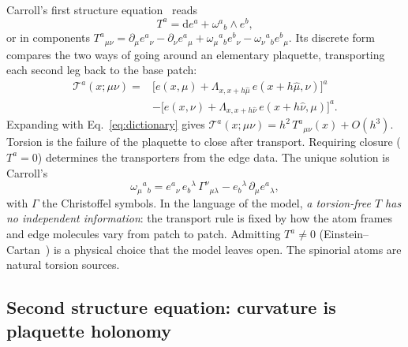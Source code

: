 \documentclass[reprint,aps,prd,amsmath,amssymb,superscriptaddress,nofootinbib,floatfix]{revtex4-2}
\theoremstyle{plain}
\theoremstyle{definition}
\theoremstyle{remark}
\newcommand{\dd}{\mathrm{d}}
\newcommand{\Tc}{\hat{T}}
\begin{document}
Carroll's first structure equation~\cite{Carroll2019} reads
\begin{equation}
T^a=\dd e^a+\omega^a{}_b\wedge e^b ,
\label{eq:cartan1}
\end{equation}
or in components $T^a{}_{\mu\nu}=\partial_\mu e^a{}_\nu-\partial_\nu e^a{}_\mu+\omega_\mu{}^a{}_be^b{}_\nu
-\omega_\nu{}^a{}_be^b{}_\mu$. Its discrete form compares the two ways of going around an elementary
plaquette, transporting each second leg back to the base patch:
\begin{equation}
\begin{aligned}
\mathcal{T}^a(x;\mu\nu)={}&\big[e(x,\mu)+\Lambda_{x,x+h\hat\mu}\,e(x+h\hat\mu,\nu)\big]^a\\
&-\big[e(x,\nu)+\Lambda_{x,x+h\hat\nu}\,e(x+h\hat\nu,\mu)\big]^a .
\end{aligned}
\label{eq:closure}
\end{equation}
Expanding with Eq.~\eqref{eq:dictionary} gives $\mathcal{T}^a(x;\mu\nu)=h^2\,T^a{}_{\mu\nu}(x)+O(h^3)$. Torsion is
the failure of the plaquette to close after transport. Requiring closure ($T^a=0$) determines the
transporters from the edge data. The unique solution is Carroll's
\begin{equation}
\omega_\mu{}^a{}_b=e^a{}_\nu\,e_b{}^\lambda\,\Gamma^\nu{}_{\mu\lambda}-e_b{}^\lambda\,\partial_\mu e^a{}_\lambda ,
\label{eq:omega_solution}
\end{equation}
with $\Gamma$ the Christoffel symbols. In the language of the model, \emph{a torsion-free $\Tc$ has no
independent information}: the transport rule is fixed by how the atom frames and edge molecules vary from
patch to patch. Admitting $T^a\neq0$ (Einstein--Cartan~\cite{Kibble1961,Sciama1964,Hehl1976}) is a
physical choice that the model leaves open. The spinorial atoms are natural torsion sources.

\subsection{Second structure equation: curvature is plaquette holonomy}
\end{document}
